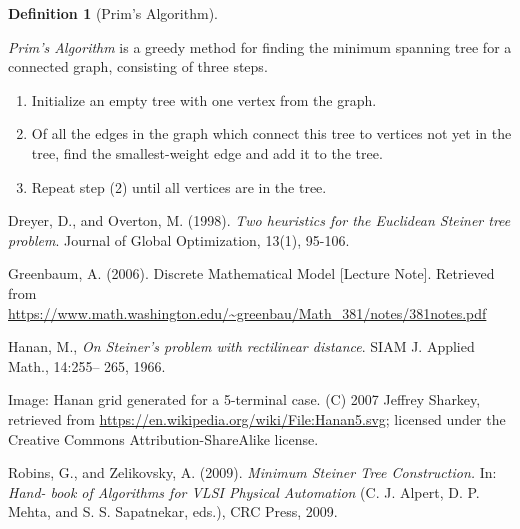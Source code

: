 \documentclass[12pt,letterpaper]{article}
\theoremstyle{definition}\newtheorem{defn}[defncounter]{Definition}
\theoremstyle{remark}\newtheorem*{remark}{Remark}
\begin{document}
\begin{defn}[Prim's Algorithm]\label{prim_algorithm}

\emph{Prim's Algorithm} is a greedy method for finding the minimum spanning 
tree for a connected graph, consisting of three steps. 
\begin{enumerate} \item[(1)] { Initialize an empty tree with one vertex 
from the graph. } \item[(2)] { Of all the edges in the graph which connect this tree to vertices not yet in the tree, find the 
smallest-weight edge and add it to the tree. } \item[(3)] { Repeat step (2) until all vertices are in the tree. }

\end{enumerate}
\end{defn}




\begin{thebibliography}{10}
Dreyer, D., and Overton,  M. (1998). \textit{Two heuristics for the Euclidean Steiner tree problem}. Journal of Global Optimization, 13(1), 
95-106.

Greenbaum, A. (2006). Discrete Mathematical Model [Lecture Note]. Retrieved from 
\url{https://www.math.washington.edu/~greenbau/Math_381/notes/381notes.pdf}

Hanan, M., \textit{On Steiner's problem with rectilinear distance}. SIAM J. Applied Math., 14:255– 265, 1966.

Image: Hanan grid generated for a 5-terminal case. (C) 2007 Jeffrey Sharkey, retrieved from
\url{https://en.wikipedia.org/wiki/File:Hanan5.svg}; licensed under the Creative Commons Attribution-ShareAlike license.


Robins, G., and Zelikovsky, A. (2009). \textit{Minimum Steiner Tree Construction.} In: \textit{Hand-
book of Algorithms for VLSI Physical Automation} (C. J. Alpert, D. P. Mehta, and
S. S. Sapatnekar, eds.), CRC Press, 2009.

\end{thebibliography}
\end{document}
